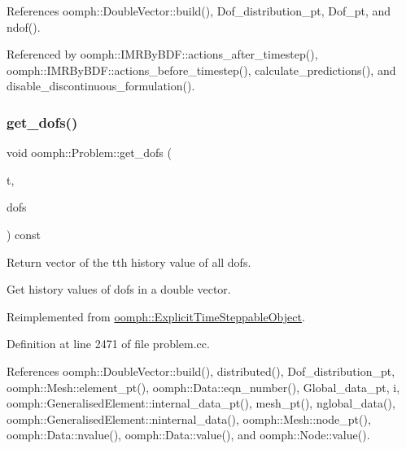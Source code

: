 References oomph\+::\+Double\+Vector\+::build(), Dof\+\_\+distribution\+\_\+pt, Dof\+\_\+pt, and ndof().



Referenced by oomph\+::\+I\+M\+R\+By\+B\+D\+F\+::actions\+\_\+after\+\_\+timestep(), oomph\+::\+I\+M\+R\+By\+B\+D\+F\+::actions\+\_\+before\+\_\+timestep(), calculate\+\_\+predictions(), and disable\+\_\+discontinuous\+\_\+formulation().

\mbox{\label{classoomph_1_1Problem_abb56c404b0dd6df75bcadab797d9a24e}} 
\subsubsection{\texorpdfstring{get\+\_\+dofs()}{get\_dofs()}\hspace{0.1cm}{\footnotesize\ttfamily [2/2]}}
{\footnotesize\ttfamily void oomph\+::\+Problem\+::get\+\_\+dofs (\begin{DoxyParamCaption}\item[{const unsigned \&}]{t,  }\item[{\hyperlink{classoomph_1_1DoubleVector}{Double\+Vector} \&}]{dofs }\end{DoxyParamCaption}) const\hspace{0.3cm}{\ttfamily [virtual]}}



Return vector of the t\textquotesingle{}th history value of all dofs. 

Get history values of dofs in a double vector. 

Reimplemented from \hyperlink{classoomph_1_1ExplicitTimeSteppableObject_a370d8d077bb5e07290f4c2f31183d8d2}{oomph\+::\+Explicit\+Time\+Steppable\+Object}.



Definition at line 2471 of file problem.\+cc.



References oomph\+::\+Double\+Vector\+::build(), distributed(), Dof\+\_\+distribution\+\_\+pt, oomph\+::\+Mesh\+::element\+\_\+pt(), oomph\+::\+Data\+::eqn\+\_\+number(), Global\+\_\+data\+\_\+pt, i, oomph\+::\+Generalised\+Element\+::internal\+\_\+data\+\_\+pt(), mesh\+\_\+pt(), nglobal\+\_\+data(), oomph\+::\+Generalised\+Element\+::ninternal\+\_\+data(), oomph\+::\+Mesh\+::node\+\_\+pt(), oomph\+::\+Data\+::nvalue(), oomph\+::\+Data\+::value(), and oomph\+::\+Node\+::value().

